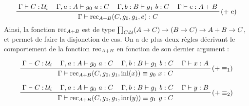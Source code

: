 \documentclass[../../rapport.tex]{subfiles}
\begin{document}
  $$
  \prfinterspace=1.2em
  \prftree[r]{($+$ e)}{\Gamma \vdash C : \U_i}{\Gamma, a : A \vdash g_0\ a : C}{\Gamma, b : B \vdash g_1\ b : C}{\Gamma \vdash e : A + B}
    {\Gamma \vdash \rec_{A+B}(C, g_0, g_1, e) : C}
  $$
  Ainsi, la fonction $\operatorname{rec}_{A+B}$ est de type $\prod_{C : \mathcal U}(A \rightarrow C) \rightarrow (B \rightarrow C) \rightarrow A + B \rightarrow C$,
  et permet de faire la disjonction de cas.
  On a de plus deux règles décrivant le comportement de la fonction $\operatorname{rec}_{A+B}$ en fonction de son dernier argument :

  $$
  \prfinterspace=1.2em
  \prftree[r]{($+ \equiv_1$)}{\Gamma \vdash C : \U_i}{\Gamma, a : A \vdash g_0\ a : C}{\Gamma, b : B \vdash g_1\ b : C}{\Gamma \vdash x : A}
    {\Gamma \vdash \rec_{A+B}(C, g_0, g_1, \inl(x)) \equiv g_0\ x : C}
  $$

  $$
  \prfinterspace=1.2em
  \prftree[r]{($+ \equiv_2$)}{\Gamma \vdash C : \U_i}{\Gamma, a : A \vdash g_0\ a : C}{\Gamma, b : B \vdash g_1\ b : C}{\Gamma \vdash y : B}
    {\Gamma \vdash \rec_{A+B}(C, g_0, g_1, \inr(y)) \equiv g_1\ y : C}
  $$
\end{document}
